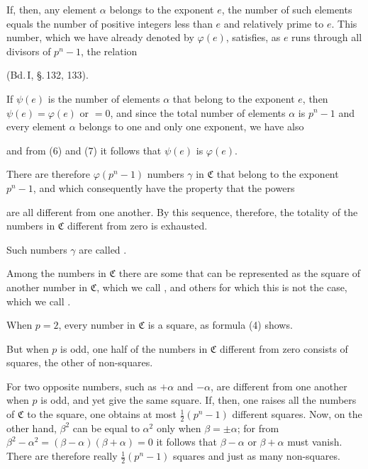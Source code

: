 If, then, any element $\alpha$ belongs to the exponent $e$, the number of such elements equals the number of positive integers less than $e$ and relatively prime to $e$. This number, which we have already denoted by $\varphi(e)$, satisfies, as $e$ runs through all divisors of $p^n - 1$, the relation


(Bd.\,I, \S.\,132, 133).

If $\psi(e)$ is the number of elements $\alpha$ that belong to the exponent $e$, then $\psi(e) = \varphi(e)$ or $= 0$, and since the total number of elements $\alpha$ is $p^n - 1$ and every element $\alpha$ belongs to one and only one exponent, we have also


and from (6) and (7) it follows that $\psi(e)$ is  $\varphi(e)$.

There are therefore $\varphi(p^n - 1)$ numbers $\gamma$ in $\mathfrak{C}$ that belong to the exponent $p^n - 1$, and which consequently have the property that the powers


are all different from one another. By this sequence, therefore, the totality of the numbers in $\mathfrak{C}$ different from zero is exhausted.

Such numbers $\gamma$ are called .

Among the numbers in $\mathfrak{C}$ there are some that can be represented as the square of another number in $\mathfrak{C}$, which we call , and others for which this is not the case, which we call .

When $p = 2$, every number in $\mathfrak{C}$ is a square, as formula (4) shows.

But when $p$ is odd, one half of the numbers in $\mathfrak{C}$ different from zero consists of squares, the other of non-squares.

For two opposite numbers, such as $+\alpha$ and $-\alpha$, are different from one another when $p$ is odd, and yet give the same square. If, then, one raises all the numbers of $\mathfrak{C}$ to the square, one obtains at most $\frac{1}{2}(p^n - 1)$ different squares. Now, on the other hand, $\beta^2$ can be equal to $\alpha^2$ only when $\beta = \pm\alpha$; for from $\beta^2 - \alpha^2 = (\beta - \alpha)(\beta + \alpha) = 0$ it follows that $\beta - \alpha$ or $\beta + \alpha$ must vanish. There are therefore really $\frac{1}{2}(p^n - 1)$ squares and just as many non-squares.
